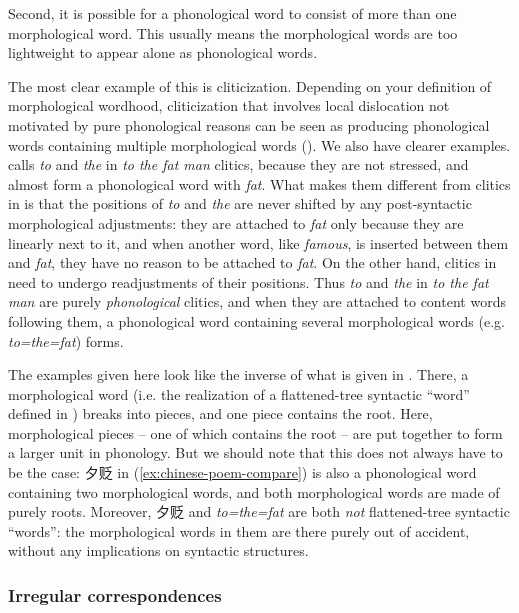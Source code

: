 \documentclass[a4paper, oneside, scheme=plain, 12pt]{article}
\newcommand*{\citepage}[1]{p.~{#1}}
\newcommand{\form}[1]{\emph{#1}}
\begin{document}
Second, it is possible for a phonological word to consist of more than one morphological word.
This usually means the morphological words are too lightweight
to appear alone as phonological words.

The most clear example of this is cliticization.
Depending on your definition of morphological wordhood,
cliticization that involves local dislocation not motivated by pure phonological reasons
can be seen as producing phonological words containing multiple morphological words
().
We also have clearer examples.
\citet[\citepage{49}]{dixon2009basic1} calls \form{to} and \form{the} in \form{to the fat man} clitics,
because they are not stressed, and almost form a phonological word with \form{fat}.
What makes them different from clitics in 
is that the positions of \form{to} and \form{the} are never shifted by any post-syntactic morphological adjustments:
they are attached to \form{fat} only because they are linearly next to it,
and when another word, like \form{famous}, is inserted between them and \form{fat},
they have no reason to be attached to \form{fat}.
On the other hand, clitics in  need to undergo readjustments of their positions.
Thus \form{to} and \form{the} in \form{to the fat man} are purely \emph{phonological} clitics,
and when they are attached to content words following them,
a phonological word containing several morphological words (e.g. \form{to=the=fat}) forms.

The examples given here look like the inverse of what is given in .
There, a morphological word (i.e. the realization of a flattened-tree syntactic ``word'' defined in ) breaks into pieces,
and one piece contains the root.
Here, morphological pieces -- one of which contains the root -- are put together to form a larger unit in phonology.
But we should note that this does not always have to be the case:
夕贬 in (\ref{ex:chinese-poem-compare}) is also a phonological word containing two morphological words,
and both morphological words are made of purely roots.
Moreover, 夕贬 and \form{to=the=fat} are both \emph{not} flattened-tree syntactic ``words'':
the morphological words in them are there purely out of accident,
without any implications on syntactic structures.

\subsubsection{Irregular correspondences}
\end{document}
